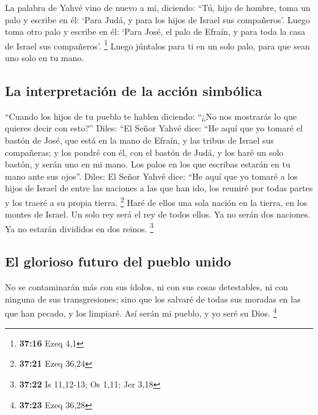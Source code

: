  La palabra de Yahvé vino de nuevo a mí, diciendo:
 ``Tú, hijo de hombre, toma un palo y escribe en él:
`Para Judá, y para los hijos de Israel sus compañeros'. Luego toma otro
palo y escribe en él: `Para José, el palo de Efraín, y para toda la casa
de Israel sus compañeros'. \footnote{\textbf{37:16} Ezeq 4,1}
 Luego júntalos para ti en un solo palo, para que sean
uno solo en tu mano.

\hypertarget{la-interpretaciuxf3n-de-la-acciuxf3n-simbuxf3lica}{%
\subsection{La interpretación de la acción
simbólica}\label{la-interpretaciuxf3n-de-la-acciuxf3n-simbuxf3lica}}

 ``Cuando los hijos de tu pueblo te hablen diciendo:
``¿No nos mostrarás lo que quieres decir con esto?'' 
Diles: ``El Señor Yahvé dice: ``He aquí que yo tomaré el bastón de José,
que está en la mano de Efraín, y las tribus de Israel sus compañeras; y
los pondré con él, con el bastón de Judá, y los haré un solo bastón, y
serán uno en mi mano.  Los palos en los que escribas
estarán en tu mano ante sus ojos''.  Diles: El Señor
Yahvé dice: ``He aquí que yo tomaré a los hijos de Israel de entre las
naciones a las que han ido, los reuniré por todas partes y los traeré a
su propia tierra. \footnote{\textbf{37:21} Ezeq 36,24} 
Haré de ellos una sola nación en la tierra, en los montes de Israel. Un
solo rey será el rey de todos ellos. Ya no serán dos naciones. Ya no
estarán divididos en dos reinos. \footnote{\textbf{37:22} Is 11,12-13;
  Os 1,11; Jer 3,18}

\hypertarget{el-glorioso-futuro-del-pueblo-unido}{%
\subsection{El glorioso futuro del pueblo
unido}\label{el-glorioso-futuro-del-pueblo-unido}}

 No se contaminarán más con sus ídolos, ni con sus cosas
detestables, ni con ninguna de sus transgresiones; sino que los salvaré
de todas sus moradas en las que han pecado, y los limpiaré. Así serán mi
pueblo, y yo seré su Dios. \footnote{\textbf{37:23} Ezeq 36,28}

